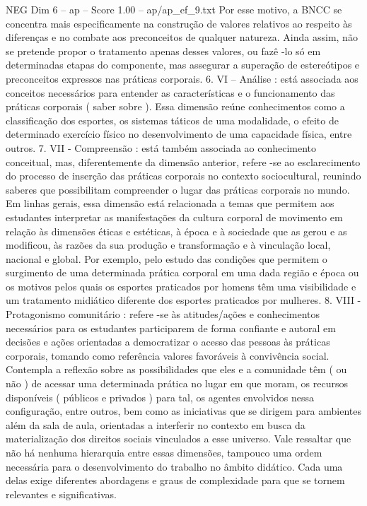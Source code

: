 \begin{textsample}{NEG Dim 6 – ap – Score 1.00 – ap/ap\_ef\_9.txt}
Por esse motivo, a BNCC se concentra mais especificamente na construção de valores relativos ao respeito às diferenças e no combate aos preconceitos de qualquer natureza.
Ainda assim, não se pretende propor o tratamento apenas desses valores, ou fazê -lo só em determinadas etapas do componente, mas assegurar a superação de estereótipos e preconceitos expressos nas práticas corporais. 6.
VI – Análise : está associada aos conceitos necessários para entender as características e o funcionamento das práticas corporais ( saber sobre ).
Essa dimensão reúne conhecimentos como a classificação dos esportes, os sistemas táticos de uma modalidade, o efeito de determinado exercício físico no desenvolvimento de uma capacidade física, entre outros. 7.
VII - Compreensão : está também associada ao conhecimento conceitual, mas, diferentemente da dimensão anterior, refere -se ao esclarecimento do processo de inserção das práticas corporais no contexto sociocultural, reunindo saberes que possibilitam compreender o lugar das práticas corporais no mundo.
Em linhas gerais, essa dimensão está relacionada a temas que permitem aos estudantes interpretar as manifestações da cultura corporal de movimento em relação às dimensões éticas e estéticas, à época e à sociedade que as gerou e as modificou, às razões da sua produção e transformação e à vinculação local, nacional e global.
Por exemplo, pelo estudo das condições que permitem o surgimento de uma determinada prática corporal em uma dada região e época ou os motivos pelos quais os esportes praticados por homens têm uma visibilidade e um tratamento midiático diferente dos esportes praticados por mulheres. 8.
VIII - Protagonismo comunitário : refere -se às atitudes/ações e conhecimentos necessários para os estudantes participarem de forma confiante e autoral em decisões e ações orientadas a democratizar o acesso das pessoas às práticas corporais, tomando como referência valores favoráveis à convivência social.
Contempla a reflexão sobre as possibilidades que eles e a comunidade têm ( ou não ) de acessar uma determinada prática no lugar em que moram, os recursos disponíveis ( públicos e privados ) para tal, os agentes envolvidos nessa configuração, entre outros, bem como as iniciativas que se dirigem para ambientes além da sala de aula, orientadas a interferir no contexto em busca da materialização dos direitos sociais vinculados a esse universo.
Vale ressaltar que não há nenhuma hierarquia entre essas dimensões, tampouco uma ordem necessária para o desenvolvimento do trabalho no âmbito didático.
Cada uma delas exige diferentes abordagens e graus de complexidade para que se tornem relevantes e significativas.

\end{textsample}
